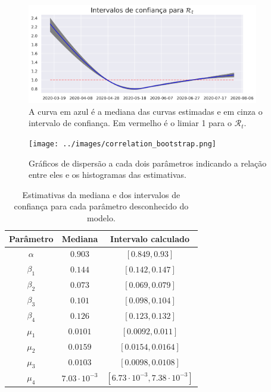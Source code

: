 \begin{figure}
    \centering
    \includegraphics[width = 0.9\textwidth]{../images/rt_confidence_interval.png}
    \caption{A curva em azul é a mediana das curvas estimadas e em cinza o
    intervalo de confiança. Em vermelho é o limiar 1 para o $\mathcal{R}_t$.}
    \label{fig:rt-confidence-interval}
\end{figure}

\begin{figure}
    \centering
    \texttt{[image: ../images/correlation\_bootstrap.png]}
    \caption{Gráficos de dispersão a cada dois parâmetros indicando a relação entre eles e os histogramas das estimativas.}
    \label{fig:correlation-bootstrap}
\end{figure}

\begin{table}[!ht]
    \centering
    \begin{tabular}{|c|c|c|}
    \hline
    \textbf{Parâmetro} & \textbf{Mediana} & \textbf{Intervalo calculado} \\ \hline
    $\alpha$        & $0.903$            & $[0.849,0.93]$                      \\ \hline
    $\beta_1$      & $0.144$          & $[0.142, 0.147]$                        \\ \hline
    $\beta_2$      & $0.073$          & $[0.069, 0.079]$                        \\ \hline
    $\beta_3$      & $0.101$          & $[0.098, 0.104]$                        \\ \hline
    $\beta_4$      & $0.126$          & $[0.123, 0.132]$                        \\ \hline
    $\mu_1$    & $0.0101$        & $[0.0092, 0.011]$                       
    \\ \hline
    $\mu_2$    & $0.0159$        & $[0.0154, 0.0164]$               
    \\ \hline
    $\mu_3$    & $0.0103$        & $[0.0098, 0.0108]$                       
    \\ \hline
    $\mu_4$    & $7.03\cdot 10^{-3}$        & $[6.73\cdot 10^{-3}, 7.38\cdot 10^{-3}]$                       
    \\ \hline
    \end{tabular}
    \caption{Estimativas da mediana e dos intervalos de confiança para cada parâmetro desconhecido do modelo.}
    \label{tab:bootstrap-estimations}
\end{table}